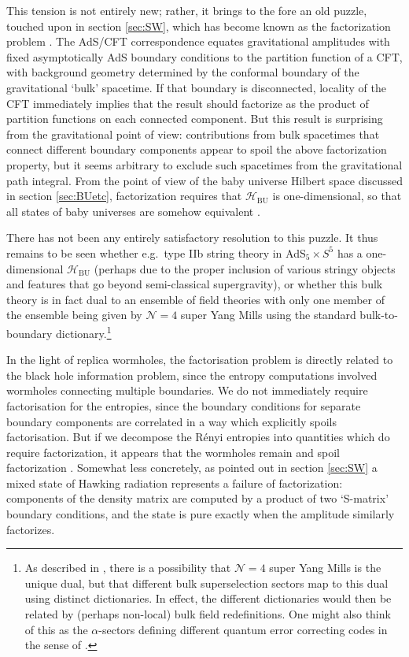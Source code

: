 \documentclass[letterpaper,12pt]{article}
\newcommand*{\hbu}{\mathcal{H}_\text{BU}} %
\begin{document}
This tension is not entirely new; rather, it brings to the fore an old puzzle, touched upon in section \ref{sec:SW}, which has become known as the factorization problem \cite{Rey:1998yx,Maldacena:2004rf,ArkaniHamed:2007js}. The AdS/CFT correspondence equates gravitational amplitudes with fixed asymptotically AdS boundary conditions to the partition function of a CFT, with background geometry determined by the conformal boundary of the gravitational `bulk' spacetime. If that boundary is disconnected, locality of the CFT immediately implies that the result should factorize as the product of partition functions on each connected component. But this result is surprising from the gravitational point of view:
contributions from bulk spacetimes that connect different boundary components appear to spoil the above factorization property, but it seems arbitrary to exclude such spacetimes from the gravitational path integral.  From the point of view of the baby universe Hilbert space discussed in section \ref{sec:BUetc}, factorization requires that $\hbu$ is one-dimensional, so that all states of baby universes are somehow equivalent \cite{Marolf:2020xie,McNamara:2020uza}.

There has not been any entirely satisfactory resolution to this puzzle.  It thus remains to be seen whether e.g.\ type IIb string theory in AdS$_5\times S^5$  has a one-dimensional $\hbu$ (perhaps due to the proper inclusion of various stringy objects and features that go beyond semi-classical supergravity), or whether this bulk theory is in fact dual to an ensemble of field theories with only one member of the ensemble being given by $\mathcal{N}=4$ super Yang Mills using the standard bulk-to-boundary dictionary.\footnote{As described in \cite{Marolf:2020xie}, there is a possibility that $\mathcal{N}=4$ super Yang Mills is the unique dual, but that different bulk superselection sectors map to this dual using distinct dictionaries.  In effect, the different dictionaries would then be related by (perhaps non-local) bulk field redefinitions. One might also think of this as the $\alpha$-sectors defining different quantum error correcting codes in the sense of \cite{Almheiri:2014lwa}.}

In the light of replica wormholes, the factorisation problem is directly related to the black hole information problem, since the entropy computations involved wormholes connecting multiple boundaries. We do not immediately require factorisation for the entropies, since the boundary conditions for separate boundary components are correlated in a way which explicitly spoils factorisation. But if we decompose the R\'enyi entropies into quantities which do require factorization, it appears that the wormholes remain and spoil factorization \cite{Stanford:2020wkf}. Somewhat less concretely, as pointed out in section \ref{sec:SW} a mixed state of Hawking radiation represents a failure of factorization: components of the density matrix are computed by a product of two `S-matrix' boundary conditions, and the state is pure exactly when the amplitude similarly factorizes.
\end{document}

